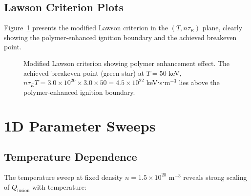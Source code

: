 \documentclass[12pt,a4paper]{article}
\begin{document}
\subsection{Lawson Criterion Plots}

Figure~\ref{fig:lawson} presents the modified Lawson criterion in the $(T, n\tau_E)$ plane, clearly showing the polymer-enhanced ignition boundary and the achieved breakeven point.

\begin{figure}[H]
\centering
{}
\caption{Modified Lawson criterion showing polymer enhancement effect. The achieved breakeven point (green star) at $T = 50$ keV, $n\tau_E T = 3.0 \times 10^{20} \times 3.0 \times 50 = 4.5 \times 10^{22}$ keV⋅s⋅m$^{-3}$ lies above the polymer-enhanced ignition boundary.}
\label{fig:lawson}
\end{figure}

\section{1D Parameter Sweeps}

\subsection{Temperature Dependence}

The temperature sweep at fixed density $n = 1.5 \times 10^{20}$ m$^{-3}$ reveals strong scaling of $Q_{\text{fusion}}$ with temperature:
\end{document}
